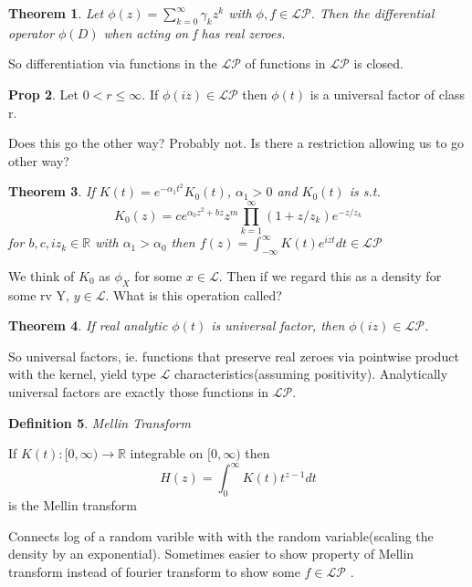 \documentclass[10pt]{article}
\newcommand{\1}{\textbf{1}}
\newcommand{\R}{\mathbb{R}}
\newcommand{\pP}{\mathcal{P}}
\newcommand{\lL}{\mathcal{L}}
\newtheorem{theorem}{Theorem}
\theoremstyle{remark}
\theoremstyle{definition}
\newtheorem{definition}[theorem]{Definition}
\theoremstyle{prop}
\newtheorem{prop}[theorem]{Prop}
\theoremstyle{Corollary}
\begin{document}
\begin{theorem}
	Let $\phi(z) = \sum_{k=0}^{\infty} \gamma_k z^k$ with $\phi, f \in \mathcal{L}\mathcal{P}$. Then the differential operator $\phi(D)$ when acting on f has real zeroes.
\end{theorem}

So differentiation via functions in the $\lL \pP$ of functions in $\lL \pP$ is closed.

\begin{prop}

Let $0 < r \leq \infty$. If $\phi(iz) \in \lL \pP$ then $\phi(t)$ is a universal factor of class r. 
\end{prop}

Does this go the other way? Probably not. Is there a restriction allowing us to go other way?

\begin{theorem}
	If $K(t) = e^{-\alpha_1 t^2} K_0(t)$, $\alpha_1 > 0$ and $K_0(t)$ is s.t.
	\[
		K_0(z) = ce^{\alpha_0 z^2 + bz} z^m \prod_{k=1}^{\infty} (1+z/z_k) e^{-z/z_k}
	\]
	for $b,c,iz_k \in \R$ with $\alpha_1 > \alpha_0$ then $f(z) = \int_{-\infty}^{\infty}K(t) e^{izt}dt \in \lL \pP$
\end{theorem}	

We think of $K_0$ as $\phi_X$ for some $x \in \lL$. Then if we regard this as a density for some rv Y, $y \in \lL$. What is this operation called?

\begin{theorem}
	If real analytic $\phi(t)$ is universal factor, then $\phi(iz) \in \lL \pP$. 
\end{theorem}

So universal factors, ie. functions that preserve real zeroes via pointwise product with the kernel, yield type $\lL$ characteristics(assuming positivity). Analytically universal factors are exactly those functions in $\lL \pP$.

\begin{definition}\textit{Mellin Transform}
	
	If $K(t) : [0,\infty) \to \R$ integrable on $[0,\infty)$ then 
	\[
		H(z) = \int_0^{\infty}K(t)t^{z-1}dt
	\]
	is the Mellin transform
\end{definition}

Connects log of a random varible with with the random variable(scaling the density by an exponential). Sometimes easier to show property of Mellin transform instead of fourier transform to show some $f \in \lL \pP$ .
\end{document}
